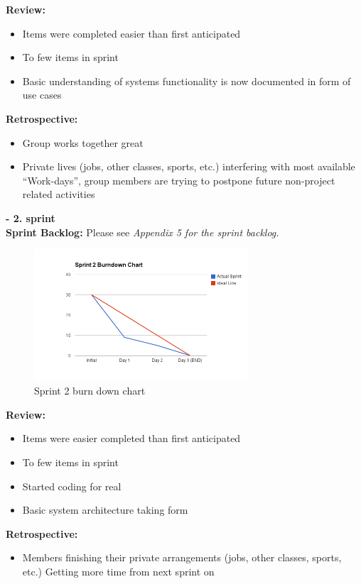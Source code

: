 \documentclass[11pt]{article}
\begin{document}
\textbf{Review:}
\begin{itemize}
\item Items were completed easier than first anticipated
\item To few items in sprint
\item Basic understanding of systems functionality is now documented in form of use cases
\end{itemize}
\textbf{Retrospective:}
\begin{itemize}
\item Group works together great
\item Private lives (jobs, other classes, sports, etc.) interfering with most available
         ``Work-days'', group members are trying to postpone future non-project related activities
\end{itemize}

\textbf{- 2. sprint} \\

\textbf{Sprint Backlog:} Please see \emph{Appendix 5 for the sprint backlog.}

\begin{figure}[H]
  		\centering
    	\includegraphics[width=300px]{images/SCRUM/Sprint 2 burndown chart.png}
    	\caption{Sprint 2 burn down chart}
\end{figure}

     \textbf{Review:}
\begin{itemize}
\item Items were easier completed than first anticipated
\item To few items in sprint
\item Started coding for real
\item Basic system architecture taking form
\end{itemize}
     \textbf{Retrospective:}
\begin{itemize}
\item Members finishing their private arrangements (jobs, other classes, sports, etc.)
       Getting more time from next sprint on
\end{itemize}
\end{document}
